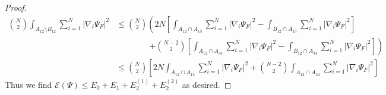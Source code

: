 \documentclass[a4paper,11pt]{article}
\newcommand{\norm}[1]{\left\lVert #1 \right\rVert}
\newcommand{\abs}[1]{\left\lvert #1 \right\rvert}
\newcommand{\R}{\mathbb{R}}
\newcommand{\rr}{\mathcal{R}}
\numberwithin{equation}{section}
\begin{document}
\begin{proof}
\begin{equation}
		\begin{aligned}
		\binom{N}{2}\int_{A_{12}\setminus B_{12}}\sum_{i=1}^{N}\abs{\nabla_i\Psi_F}^2&\leq \binom{N}{2}\left(2N\left[\int_{A_{12}\cap A_{13}}\sum_{i=1}^{N}\abs{\nabla_i\Psi_F}^2-\int_{B_{12}\cap A_{13}}\sum_{i=1}^{N}\abs{\nabla_i\Psi_F}^2\right]\right.\\
		&\qquad\qquad\left.+\binom{N-2}{2}\left[\int_{A_{12}\cap A_{34}}\sum_{i=1}^{N}\abs{\nabla_i\Psi_F}^2-\int_{B_{12}\cap A_{34}}\sum_{i=1}^{N}\abs{\nabla_i\Psi_F}^2\right]\right)\\
		&\leq \binom{N}{2}\left[2N\int_{A_{12}\cap A_{13}}\sum_{i=1}^{N}\abs{\nabla_i\Psi_F}^2+\binom{N-2}{2}\int_{A_{12}\cap A_{34}}\sum_{i=1}^{N}\abs{\nabla_i\Psi_F}^2\right]
		\end{aligned}
		\end{equation}
		Thus we find $
		\mathcal{E}(\Psi)\leq E_0+E_1+E_2^{(1)}+E_2^{(2)}$ as desired.
	\end{proof}
\end{document}
